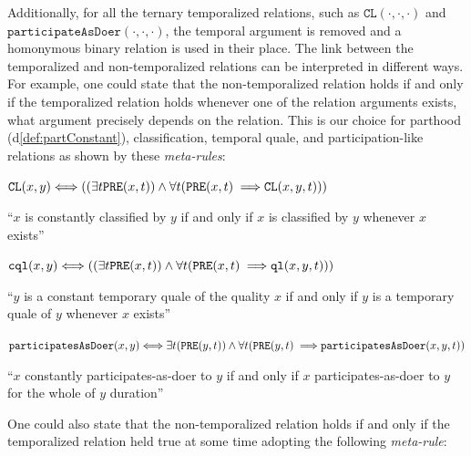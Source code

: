 \documentclass[sw]{iosart2x}
\newcommand{\bflist}{\begin{list}{}{\setlength{\topsep}{2mm}\setlength{\partopsep}{0mm}\setlength{\parsep}{0mm}\setlength{\leftmargin}{9mm}\setlength{\labelwidth}{8mm}}}
\newcommand{\eflist}{\end{list}}
\newcommand{\DefLabel}{\textrm{d}}
\newcounter{cntdef}
\newcommand{\mydf}[1]{\refstepcounter{cntdef}\begin{small}{\bf \DefLabel\thecntdef\label{def:#1}}\end{small}}
\newcommand{\mytext}[1]{``#1''}
\newcommand{\refdf}[1]{({\DefLabel}\ref{#1})}
\newcommand{\generalStyle}[1]{\texttt{#1}}
\newcommand{\biRel}[3]{\generalStyle{#1}(#2,#3)}
\newcommand{\triRel}[4]{\generalStyle{#1}(#2,#3,#4)}
\newcommand{\myiff}{\Longleftrightarrow}
\newcommand{\myfi}{\hspace{0.9mm} \Longrightarrow}
\newcommand{\DOLCEQualeDirect}[2]{\biRel{{cql}}{#1}{#2}}
\newcommand{\DOLCECLbyBinary}[2]{\biRel{CL}{#1}{#2}}
\newcommand{\DOLCECLby}[3]{\triRel{CL}{#1}{#2}{#3}}
\newcommand{\DOLCEPRE}[2]{\biRel{PRE}{#1}{#2}}
\newcommand{\participateAsDoer}[3]{\triRel{participatesAsDoer}{#1}{#2}{#3}}
\newcommand{\participateAsDoerBinary}[2]{\biRel{participatesAsDoer}{#1}{#2}}
\newcommand{\playAs}[3]{\triRel{playAs}{#1}{#2}{#3}}
\newcommand{\DOLCEQualeTer}[3]{\triRel{ql}{#1}{#2}{#3}}
\newcommand{\TODOinline}[1]{{\color{red} #1
}}
\newcommand{\myComment}[1]{{\unskip \ignorespaces}}
\begin{document}

Additionally, for all the ternary temporalized relations, such as $\DOLCECLby{\cdot}{\cdot}{\cdot}$ \myComment{, $\playAs{\cdot}{\cdot}{\cdot}$,} 
and $\hspace{0pt}\texttt{participateAsDoer}(\cdot,\cdot,\cdot)$, the temporal argument is removed and a homonymous binary relation is used in their place.
The link between the temporalized and non-temporalized relations can be interpreted in different ways. For example, one could state that the non-temporalized relation holds if and only if the temporalized relation holds whenever one of the relation arguments exists, what argument precisely depends on the relation. This is our choice for parthood \refdf{def:partConstant}, classification, temporal quale, and participation-like relations as shown by these \textit{meta-rules}: %
\bflist
\item[\mydf{CLnontemp}$_{meta}$] $ \DOLCECLbyBinary{x}{y} \myiff ((\exists t \DOLCEPRE{x}{t}) \land \forall t (\DOLCEPRE{x}{t} \myfi  \DOLCECLby{x}{y}{t}))$ 
\item \mytext{$x$ is constantly classified by $y$ if and only if $x$ is classified by $y$ whenever $x$ exists}
\item[\mydf{Qualenontemp}$_{meta}$] $ \DOLCEQualeDirect{x}{y} \myiff ((\exists t \DOLCEPRE{x}{t}) \land \forall t (\DOLCEPRE{x}{t} \myfi  \DOLCEQualeTer{x}{y}{t}))$ 
\item \mytext{$y$ is a constant temporary quale of the quality $x$ if and only if $y$ is a temporary quale of $y$ whenever $x$ exists}
\item[\mydf{participationDoerNonTemp}$_{meta}$] $ \participateAsDoerBinary{x}{y} \myiff \exists t (\DOLCEPRE{y}{t}) \land \forall t (\DOLCEPRE{y}{t} \myfi \participateAsDoer{x}{y}{t})$
\item \mytext{$x$ constantly participates-as-doer to $y$ if and only if $x$ participates-as-doer to $y$ for the whole of $y$ duration}
\eflist
One could also state that the non-temporalized relation holds if and only if the temporalized relation held true at some time adopting the following \textit{meta-rule}:%
\end{document}
